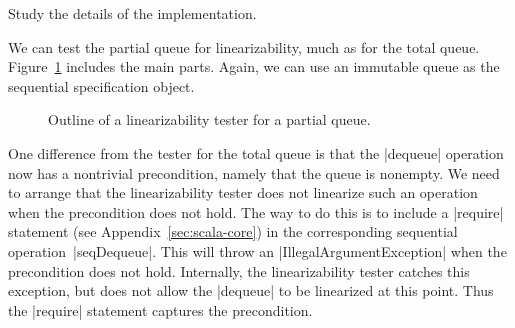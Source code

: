 \begin{instruction}
Study the details of the implementation.
\end{instruction}


We can test the partial queue for linearizability, much as for the total queue.
Figure~\ref{fig:partial-queue-lin-tester} includes the main parts.  Again, we
can use an immutable queue as the sequential specification object.


\begin{figure}
\caption{Outline of a linearizability tester for a partial queue.}
\label{fig:partial-queue-lin-tester}
\end{figure}


One difference from the tester for the total queue is that the |dequeue|
operation now has a nontrivial precondition, namely that the queue is
nonempty.  We need to arrange that the linearizability tester does not
linearize such an operation when the precondition does not hold.  The way to
do this is to include a |require| statement (see Appendix~\ref{sec:scala-core})
in the corresponding sequential operation~|seqDequeue|.  This will throw an
|IllegalArgumentException| when the precondition does not hold.  Internally,
the linearizability tester catches this exception, but does not allow the
|dequeue| to be linearized at this point.  Thus the |require| statement
captures the precondition. 

